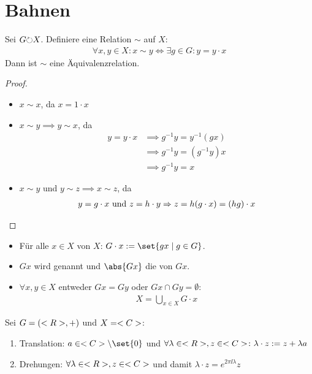 \section{Bahnen}
\begin{lemma}
	Sei $G \Circlearrowleft X$. Definiere eine Relation $\sim$ auf $X$:
	\begin{align*}
		\forall x,y \in X \colon x \sim y \Leftrightarrow \exists g \in G\colon y = y \cdot x
	\end{align*}
	Dann ist $\sim$ eine Äquivalenzrelation.
\end{lemma}
\begin{proof}
	\begin{itemize}
		\item $x \sim x$, da $x = 1 \cdot x$
		\item $x \sim y \implies y \sim x$, da
		\begin{align*}
			y = y\cdot x &\implies g^{-1}y = y^{-1}(gx)\\
			&\implies g^{-1}y = (g^{-1}y)x\\
			& \implies g^{-1}y = x
		\end{align*}
		\item $x \sim y$ und $y \sim z \implies x \sim z$, da
		\begin{align*}
			y = g\cdot x \text{ und } z = h \cdot y \Rightarrow z = h(g\cdot x) = (hg)\cdot x
		\end{align*}
	\end{itemize}
\end{proof}
\begin{definition}
	\begin{itemize}
		\item Für alle $x \in X$  von $X$: $G\cdot x := \set{gx \mid g \in G}$.
		\item $Gx$ wird  genannt und $\abs{Gx}$ die  von $Gx$.
		\item $\forall x,y \in X$ entweder $Gx = Gy$ oder $Gx \cap Gy = \emptyset$:
		\begin{align*}
			X = \bigcup_{x \in X}G \cdot x
		\end{align*}
	\end{itemize}
\end{definition}
\begin{*example}
	Sei $G=(<R>,+)$ und $X = <C>$:
	\begin{enumerate} %
		\item Translation: $a \in \C\setminus \set{0}$ und $\forall \lambda \in <R>, z \in <C>\colon \lambda \cdot z := z + \lambda a$
		\item Drehungen: $\forall \lambda \in <R>, z \in <C>$ und damit $\lambda \cdot z = e^{2\pi\ii \lambda}z$
	\end{enumerate}
\end{*example}
